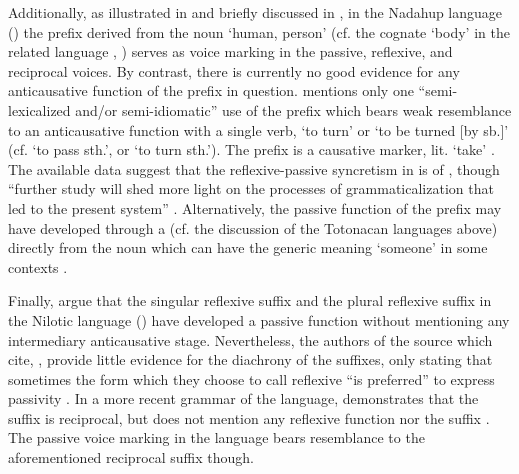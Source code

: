\newpage

Additionally, as illustrated in  and briefly discussed in , in the Nadahup language  () the prefix  derived from the noun  ‘human, person’ (cf. the cognate  ‘body’ in the related language , \citealt[486]{epps:2008}) serves as voice marking in the passive, reflexive, and reciprocal voices. By contrast, there is currently no good evidence for any anticausative function of the prefix in question. \cite[314, 476]{epps:2008} mentions only one “semi-lexicalized and/or semi-idiomatic” use of the prefix which bears weak resemblance to an anticausative function with a single verb,  ‘to turn’ or ‘to be turned [by sb.]’ (cf.  ‘to pass sth.’,  or  ‘to turn sth.’). The prefix  is a causative marker, lit. ‘take’ \citep[518]{epps:2008}. The available data suggest that the reflexive-passive syncretism in  is of , though “further study will shed more light on the processes of grammaticalization that led to the present system” \citep[487]{epps:2008}. Alternatively, the passive function of the prefix  may have developed through a  (cf. the discussion of the Totonacan languages above) directly from the noun  which can have the generic meaning ‘someone’ in some contexts \citep[479]{epps:2008}.

Finally, \cite[253]{heine:kuteva:2002} argue that the singular reflexive suffix  and the plural reflexive suffix  in the Nilotic language  () have developed a passive function without mentioning any intermediary anticausative stage. Nevertheless, the authors of the source which \citeauthor{heine:kuteva:2002} cite, \cite{hilders:lawrance:1956}, provide little evidence for the diachrony of the suffixes, only stating that sometimes the form which they choose to call reflexive “is preferred” to express passivity \citep[57]{hilders:lawrance:1956}. In a more recent grammar of the language, \cite[175ff.]{barasa:2017} demonstrates that the suffix  is reciprocal, but does not mention any reflexive function nor the suffix . The passive voice marking  \citep[171ff.]{barasa:2017} in the language bears resemblance to the aforementioned reciprocal suffix though. 


